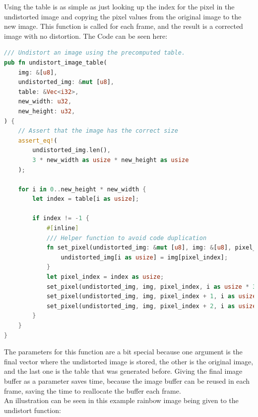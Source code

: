Using the table is as simple as just looking up the index for the pixel in the undistorted image and copying the pixel values from the original image to the new image.
This function is called for each frame, and the result is a corrected image with no distortion.
The Code can be seen here:
\begin{lstlisting}[language=rust,breaklines,label={lst:undistort_image_table}]
/// Undistort an image using the precomputed table.
pub fn undistort_image_table(
    img: &[u8],
    undistorted_img: &mut [u8],
    table: &Vec<i32>,
    new_width: u32,
    new_height: u32,
) {
    // Assert that the image has the correct size
    assert_eq!(
        undistorted_img.len(),
        3 * new_width as usize * new_height as usize
    );

    for i in 0..new_height * new_width {
        let index = table[i as usize];

        if index != -1 {
            #[inline]
            /// Helper function to avoid code duplication
            fn set_pixel(undistorted_img: &mut [u8], img: &[u8], pixel_index: usize, i: usize) {
                undistorted_img[i as usize] = img[pixel_index];
            }
            let pixel_index = index as usize;
            set_pixel(undistorted_img, img, pixel_index, i as usize * 3);
            set_pixel(undistorted_img, img, pixel_index + 1, i as usize * 3 + 1);
            set_pixel(undistorted_img, img, pixel_index + 2, i as usize * 3 + 2);
        }
    }
}
\end{lstlisting}
The parameters for this function are a bit special because one argument is the final vector where the undistorted image is stored, the other is the original image, and the last one is the table that was generated before.
Giving the final image buffer as a parameter saves time, because the image buffer can be reused in each frame, saving the time to reallocate the buffer each frame.
\\
An illustration can be seen in this example rainbow image being given to the undistort function:
